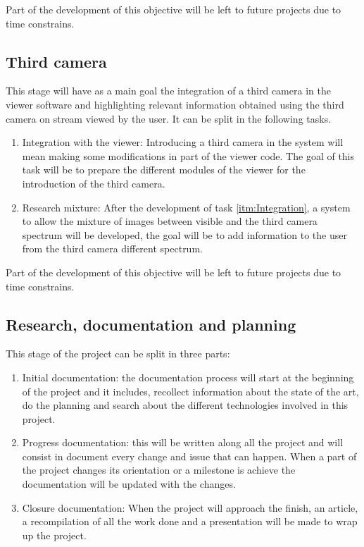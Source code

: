 \documentclass[10pt,a4paper,twocolumn,twoside]{article}
\begin{document}
	Part of the development of this objective will be left to future projects due to time constrains.
	
	\subsection{Third camera}
	This stage will have as a main goal the integration of a third camera in the viewer software and highlighting relevant information obtained using the third camera on stream viewed by the user. It can be split in the following tasks.
	
	\begin{enumerate}
		\item \label{itm:Integration} Integration with the viewer: Introducing a third camera in the system will mean making some modifications in part of the viewer code. The goal of this task will be to prepare the different modules of the viewer for the introduction of the third camera.
		
		\item Research mixture: After the development of task \ref{itm:Integration}, a system to allow the mixture of images between visible and the third camera spectrum will be developed, the goal will be to add information to the user from the third camera different spectrum.
	\end{enumerate}
	
	Part of the development of this objective will be left to future projects due to time constrains.
	
	
	\subsection{Research, documentation and planning}
	This stage of the project can be split in three parts:
	\begin{enumerate}
		\item Initial documentation: the documentation process will start at the beginning of the project and it includes, recollect information about the state of the art, do the planning and search about the different technologies involved in this project. 
		
		\item Progress documentation: this will be written along all the project and will consist in document every change and issue that can happen. When a part of the project changes its orientation or a milestone is achieve the documentation will be updated with the changes. 
		
		\item Closure documentation: When the project will approach the finish, an article, a recompilation of all the work done and a presentation will be made to wrap up the project.
		
	\end{enumerate}
\end{document}
